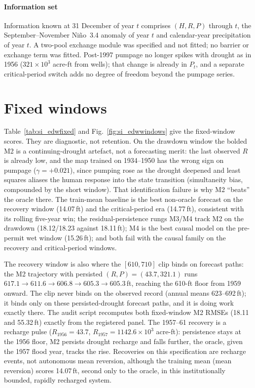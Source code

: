 \documentclass[preprint,11pt,authoryear]{elsarticle}
\theoremstyle{remark}
\begin{document}
\paragraph{Information set} Information known at 31 December of year $t$ comprises $(H,R,P)$ through $t$, the September--November Ni\~no~3.4 anomaly of year $t$ and calendar-year precipitation of year $t$. A two-pool exchange module was specified and not fitted; no barrier or exchange term was fitted. Post-1997 pumpage no longer spikes with drought as in 1956 ($321\times10^3$ acre-ft from wells); that change is already in $P_t$, and a separate critical-period switch adds no degree of freedom beyond the pumpage series.

\FloatBarrier
\section{Fixed windows}\label{si:edwfixed}

Table~\ref{tab:si_edwfixed} and Fig.~\ref{fig:si_edwwindows} give the fixed-window scores. They are diagnostic, not retention. On the drawdown window the bolded M2 is a continuing-drought artefact, not a forecasting merit: the last observed $R$ is already low, and the map trained on 1934--1950 has the wrong sign on pumpage ($\gamma=+0.021$), since pumping rose as the drought deepened and least squares aliases the human response into the state transition (simultaneity bias, compounded by the short window). That identification failure is why M2 ``beats'' the oracle there. The train-mean baseline is the best non-oracle forecast on the recovery window (14.07\,ft) and the critical-period era (14.77\,ft), consistent with its rolling five-year win; the residual-persistence rungs M3/M4 track M2 on the drawdown (18.12/18.23 against 18.11\,ft); M4 is the best causal model on the pre-permit wet window (15.26\,ft); and both fail with the causal family on the recovery and critical-period windows.

The recovery window is also where the $[610,710]$ clip binds on forecast paths: the M2 trajectory with persisted $(R,P)=(43.7,321.1)$ runs $617.1\to611.6\to606.8\to605.3\to605.3$\,ft, reaching the 610-ft floor from 1959 onward. The clip never binds on the observed record (annual means 623--692\,ft); it binds only on these persisted-drought forecast paths, and it is doing work exactly there. The audit script recomputes both fixed-window M2 RMSEs (18.11 and 55.32\,ft) exactly from the registered panel. The 1957--61 recovery is a recharge pulse ($R_{1956}=43.7$, $R_{1957}=1142.6\times10^3$ acre-ft): persistence stays at the 1956 floor, M2 persists drought recharge and falls further, the oracle, given the 1957 flood year, tracks the rise. Recoveries on this specification are recharge events, not autonomous mean reversion, although the training mean (mean reversion) scores 14.07\,ft, second only to the oracle, in this institutionally bounded, rapidly recharged system.
\end{document}
